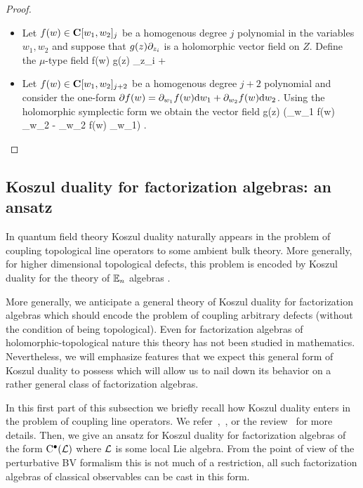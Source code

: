 \begin{proof}

\begin{itemize}
\item Let $f(w) \in \mathbf{C}[w_1,w_2]_j$ be a homogenous degree $j$ polynomial in the variables $w_1,w_2$ and suppose that $g(z) \partial_{z_i}$ is a holomorphic vector field on $Z$. 
Define the $\mu$-type field
\beqn
f(w) g(z) \del_{z_i} + \cdots
\eeqn
\item Let $f(w) \in \mathbf{C}[w_1,w_2]_{j+2}$ be a homogenous degree $j+2$ polynomial and consider the one-form $\partial f(w) = \partial_{w_1} f(w){\rm d} w_1 + \partial_{w_2} f(w) {\rm d} w_2$. Using the holomorphic symplectic form we obtain the vector field
\beqn
g(z) \left(\del_{w_1} f(w) \del_{w_2} - \del_{w_2} f(w) \del_{w_1}\right) .
\eeqn
\end{itemize}
\end{proof}

\subsection{Koszul duality for factorization algebras: an ansatz} 

In quantum field theory Koszul duality naturally appears in the problem of coupling topological line operators to some ambient bulk theory. 
More generally, for higher dimensional topological defects, this problem is encoded by Koszul duality for the theory of $\mathbb E_n$ algebras \cite{FrancisGaitsgory} \cite[\S 5.2]{LurieHA}.

More generally, we anticipate a general theory of Koszul duality for factorization algebras which should encode the problem of coupling arbitrary defects (without the condition of being topological).
Even for factorization algebras of holomorphic-topological nature this theory has not been studied in mathematics. 
Nevertheless, we will emphasize features that we expect this general form of Koszul duality to possess which will allow us to nail down its behavior on a rather general class of factorization algebras. 

In this first part of this subsection we briefly recall how Koszul duality enters in the problem of coupling line operators. 
We refer~\cite[\S 6]{CP1},~\cite[\S 8]{CG1}, or the review~\cite{PWkoszul} for more details. 
Then, we give an ansatz for Koszul duality for factorization algebras of the form ${\rm C}^\bullet(\mathcal L)$ where $\mathcal L$ is some local Lie algebra. 
From the point of view of the perturbative BV formalism this is not much of a restriction, all such factorization algebras of classical observables can be cast in this form. 

